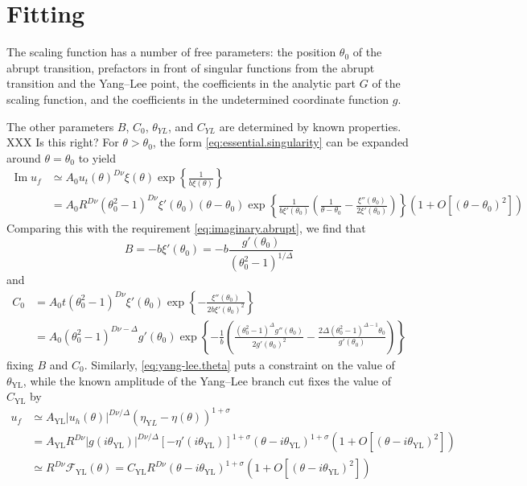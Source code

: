 \documentclass[
aps,
pre,
preprint,
longbibliography,
floatfix
]{revtex4-2}
\begin{document}
\section{Fitting}

The scaling function has a number of free parameters: the position $\theta_0$
of the abrupt transition, prefactors in front of singular functions from the
abrupt transition and the Yang--Lee point, the coefficients in the analytic
part $G$ of the scaling function, and the coefficients in the undetermined
coordinate function $g$.

The other parameters $B$, $C_0$, $\theta_{YL}$, and $C_{YL}$ are determined by known properties. {\color{blue} XXX Is this right?}
For $\theta>\theta_0$, the form \eqref{eq:essential.singularity} can be
expanded around $\theta=\theta_0$ to yield
\begin{equation}
  \begin{aligned}
    \operatorname{Im}u_f
    &\simeq A_0 u_t(\theta)^{D\nu}\xi(\theta)\exp\left\{\frac1{b\xi(\theta)}\right\} \\
    &=A_0R^{D\nu}(\theta_0^2-1)^{D\nu}\xi'(\theta_0)(\theta-\theta_0)
    \exp\left\{\frac1{b\xi'(\theta_0)}\left(\frac1{\theta-\theta_0}
      -\frac{\xi''(\theta_0)}{2\xi'(\theta_0)}\right)
      \right\}\left(1+O[(\theta-\theta_0)^2]\right)
  \end{aligned}
\end{equation}
Comparing this with the requirement \eqref{eq:imaginary.abrupt}, we find that
\begin{equation}
  B=-b\xi'(\theta_0)=-b\frac{g'(\theta_0)}{(\theta_0^2-1)^{1/\Delta}}
\end{equation}
and
\begin{equation}
  \begin{aligned}
    C_0&=A_0t(\theta_0^2-1)^{D\nu}\xi'(\theta_0)\exp\left\{
    -\frac{\xi''(\theta_0)}{2b\xi'(\theta_0)^2}
  \right\} \\
       &=
       A_0(\theta_0^2-1)^{D\nu-\Delta}g'(\theta_0)
       \exp\left\{-\frac1b\left(\frac{(\theta_0^2-1)^\Delta g''(\theta_0)}{2g'(\theta_0)^2}-\frac{2\Delta(\theta_0^2-1)^{\Delta - 1}\theta_0}{g'(\theta_0)}
       \right)\right\}
  \end{aligned}
\end{equation}
fixing $B$ and $C_0$. Similarly, \eqref{eq:yang-lee.theta} puts a constraint on
the value of $\theta_\mathrm{YL}$, while the known amplitude of the Yang--Lee
branch cut fixes the value of $C_\mathrm{YL}$ by
\begin{equation}
  \begin{aligned}
    u_f
    &\simeq A_\mathrm{YL}|u_h(\theta)|^{D\nu/\Delta}(\eta_{\mathrm YL}-\eta(\theta))^{1+\sigma} \\
    &=A_\mathrm{YL}R^{D\nu}|g(i\theta_\mathrm{YL})|^{D\nu/\Delta}[-\eta'(i\theta_\mathrm{YL})]^{1+\sigma}(\theta-i\theta_\mathrm{YL})^{1+\sigma}\left(1+O[(\theta-i\theta_\mathrm{YL})^2]\right)\\
    &\simeq R^{D\nu}\mathcal F_\mathrm{YL}(\theta)
    =C_\mathrm{YL}R^{D\nu}(\theta-i\theta_\mathrm{YL})^{1+\sigma}\left(1+O[(\theta-i\theta_\mathrm{YL})^2]\right)
\end{aligned}
\end{equation}
\end{document}
